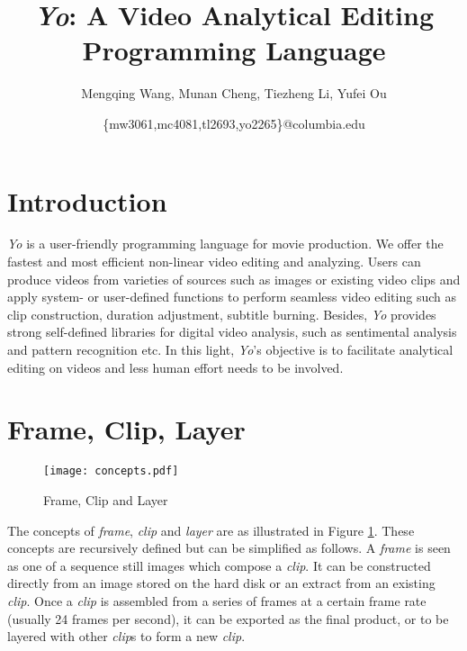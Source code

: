 \documentclass[12pt]{article}
\title{\textit{Yo}: A Video Analytical Editing Programming Language}
\author{Mengqing Wang, Munan Cheng, Tiezheng Li, Yufei Ou}
\date{\{mw3061,mc4081,tl2693,yo2265\}@columbia.edu}
\begin{document}
\maketitle

\section{Introduction}
\textit{Yo} is a user-friendly programming language for movie production. We offer the fastest and most efficient non-linear video editing and analyzing. Users can produce videos from varieties of sources such as images or existing video clips and apply system- or user-defined functions to perform seamless video editing such as clip construction, duration adjustment, subtitle burning. Besides, \textit{Yo} provides strong self-defined libraries for digital video analysis, such as sentimental analysis and pattern recognition etc. In this light, \textit{Yo}'s objective is to facilitate analytical editing on videos and less human effort needs to be involved.



\section{Frame, Clip, Layer}
\begin{figure}[ht]
	\centering
	\texttt{[image: concepts.pdf]}
	\caption{Frame, Clip and Layer}
	\label{fig:concepts}
\end{figure}

The concepts of \textit{frame}, \textit{clip} and \textit{layer} are as illustrated in Figure \ref{fig:concepts}. These concepts are recursively defined but can be simplified as follows. A \textit{frame} is seen as one of a sequence still images which compose a \textit{clip}. It can be constructed directly from an image stored on the hard disk or an extract from an existing \textit{clip}. Once a \textit{clip} is assembled from a series of frames at a certain frame rate (usually 24 frames per second), it can be exported as the final product, or to be layered with other \textit{clip}s to form a new \textit{clip}.
\end{document}
